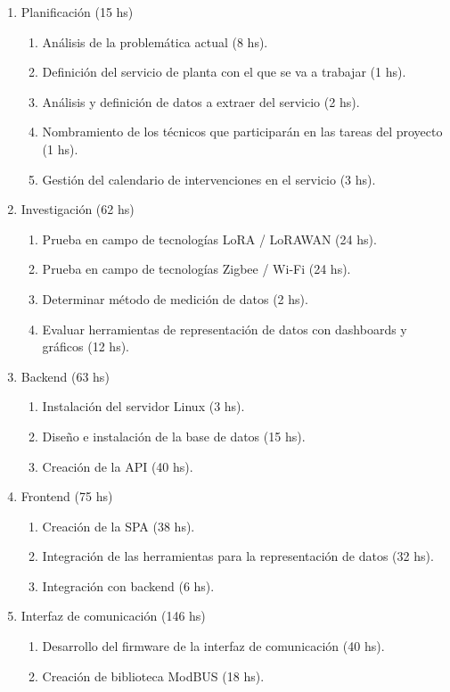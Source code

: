 \documentclass[
11pt%
]{charter}
\begin{document}
\begin{enumerate}
\item Planificación (15 hs)
	\begin{enumerate}
	\item Análisis de la problemática actual (8 hs).
	\item Definición del servicio de planta con el que se va a trabajar (1 hs).
	\item Análisis y definición de datos a extraer del servicio (2 hs).
	\item Nombramiento de los técnicos que participarán en las tareas del proyecto (1 hs).
	\item Gestión del calendario de intervenciones en el servicio (3 hs).
	\end{enumerate}
\item Investigación (62 hs)
	\begin{enumerate}
	\item Prueba en campo de tecnologías LoRA / LoRAWAN (24 hs).
	\item Prueba en campo de tecnologías Zigbee / Wi-Fi (24 hs).
	\item Determinar método de medición de datos (2 hs).
	\item Evaluar herramientas de representación de datos con dashboards y gráficos (12 hs).
	\end{enumerate}
\item Backend (63 hs)
	\begin{enumerate}
	\item Instalación del servidor Linux (3 hs).
	\item Diseño e instalación de la base de datos (15 hs).
	\item Creación de la API (40 hs).
	\end{enumerate}
\item Frontend (75 hs)
	\begin{enumerate}
	\item Creación de la SPA (38 hs).
	\item Integración de las herramientas para la representación de datos (32 hs).
	\item Integración con backend (6 hs).
	\end{enumerate}
\item Interfaz de comunicación (146 hs)
	\begin{enumerate}
	\item Desarrollo del firmware de la interfaz de comunicación (40 hs).
	\item Creación de biblioteca ModBUS (18 hs).

\end{enumerate}
\end{enumerate}
\end{document}
